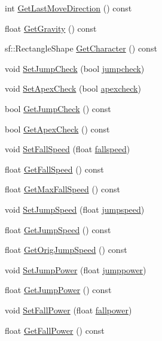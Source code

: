 \begin{DoxyCompactItemize}
\item 
int \hyperlink{classAI_ad5a76573afc4ca46c3e8c63bb71c1cef}{Get\+Last\+Move\+Direction} () const 
\item 
float \hyperlink{classAI_aaf2f8c7e9bf518bee620e5731faa1ed7}{Get\+Gravity} () const 
\item 
sf\+::\+Rectangle\+Shape \hyperlink{classAI_af8845b14b9634d95149a881489284b55}{Get\+Character} () const 
\item 
void \hyperlink{classAI_af70dcfec2f6f98c2113f416895c14214}{Set\+Jump\+Check} (bool \hyperlink{classAI_aefe27541a9d4aaa10d23b421de4b2405}{jumpcheck})
\item 
void \hyperlink{classAI_acb9cc6624a01a27516f68406429f7496}{Set\+Apex\+Check} (bool \hyperlink{classAI_a4f56968f26a5263911c83062945aaec7}{apexcheck})
\item 
bool \hyperlink{classAI_a44af0b44c634384d9aa5200b6e1b7427}{Get\+Jump\+Check} () const 
\item 
bool \hyperlink{classAI_ada8f2f0cbeef5ebaf251564d4e9b6510}{Get\+Apex\+Check} () const 
\item 
void \hyperlink{classAI_ab42bf8c5b4ec0d54423b55e2db524640}{Set\+Fall\+Speed} (float \hyperlink{classAI_a8aff5a3b49415dcb533f0a570290bd86}{fallspeed})
\item 
float \hyperlink{classAI_a5518f137f504e35a88a16a374c30390b}{Get\+Fall\+Speed} () const 
\item 
float \hyperlink{classAI_a9c878567c39d6a9c293931a679b37ffd}{Get\+Max\+Fall\+Speed} () const 
\item 
void \hyperlink{classAI_a90247314e34a1d0e1376a27dac61f1c4}{Set\+Jump\+Speed} (float \hyperlink{classAI_a9bcfb85a19a10d064a1db2772be9e30d}{jumpspeed})
\item 
float \hyperlink{classAI_a9d3a04adec2708eae25fa24af2eb23f7}{Get\+Jump\+Speed} () const 
\item 
float \hyperlink{classAI_a028ef0d497fa8f7d9acb93dc7cc7aaf7}{Get\+Orig\+Jump\+Speed} () const 
\item 
void \hyperlink{classAI_a5fbb2086d91fe1a31e916d0874f39eb3}{Set\+Jump\+Power} (float \hyperlink{classAI_a79f9ea14d535b646e35ab8f2d95f59da}{jumppower})
\item 
float \hyperlink{classAI_a92873a9908dc947bba6f7270765614a7}{Get\+Jump\+Power} () const 
\item 
void \hyperlink{classAI_ae6a7d8162fbe9a74c86dec4efb5d940c}{Set\+Fall\+Power} (float \hyperlink{classAI_ab6d693d4a0669758d7bcc48d43d348b7}{fallpower})
\item 
float \hyperlink{classAI_a660ad0d23f78462f58063848a2796e9d}{Get\+Fall\+Power} () const 
\end{DoxyCompactItemize}
